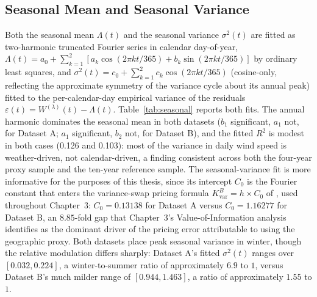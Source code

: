 \subsection{Seasonal Mean and Seasonal Variance}
\label{sec:phase1-seasonal}

Both the seasonal mean $\Lambda(t)$ and the seasonal variance $\sigma^2(t)$ are fitted as two-harmonic truncated Fourier series in calendar day-of-year, $\Lambda(t) = a_0 + \sum_{k=1}^2 [a_k \cos(2\pi k t/365) + b_k \sin(2\pi k t /365)]$ by ordinary least squares, and $\sigma^2(t) = c_0 + \sum_{k=1}^2 c_k \cos(2\pi k t/365)$ (cosine-only, reflecting the approximate symmetry of the variance cycle about its annual peak) fitted to the per-calendar-day empirical variance of the residuals $\varepsilon(t) = W^{(\lambda)}(t) - \Lambda(t)$. Table~\ref{tab:seasonal} reports both fits. The annual harmonic dominates the seasonal mean in both datasets ($b_1$ significant, $a_1$ not, for Dataset A; $a_1$ significant, $b_2$ not, for Dataset B), and the fitted $R^2$ is modest in both cases (0.126 and 0.103): most of the variance in daily wind speed is weather-driven, not calendar-driven, a finding consistent across both the four-year proxy sample and the ten-year reference sample. The seasonal-variance fit is more informative for the purposes of this thesis, since its intercept $C_0$ is the Fourier constant that enters the variance-swap pricing formula $K_{\text{var}}^B = h \times C_0$ of \citet{Tol1997}, used throughout Chapter~3: $C_0 = 0.13138$ for Dataset A versus $C_0 = 1.16277$ for Dataset B, an $8.85$-fold gap that Chapter~3's Value-of-Information analysis identifies as the dominant driver of the pricing error attributable to using the geographic proxy. Both datasets place peak seasonal variance in winter, though the relative modulation differs sharply: Dataset A's fitted $\sigma^2(t)$ ranges over $[0.032, 0.224]$, a winter-to-summer ratio of approximately $6.9$ to $1$, versus Dataset B's much milder range of $[0.944, 1.463]$, a ratio of approximately $1.55$ to $1$.


